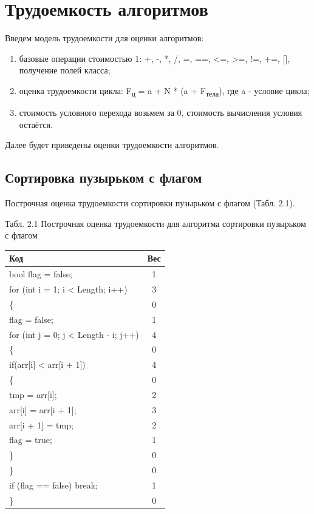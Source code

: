 \documentclass[12pt]{report}
\begin{document}
\section{Трудоемкость алгоритмов}
Введем модель трудоемкости для оценки алгоритмов:
\begin{enumerate}
  	\item  базовые операции стоимостью 1: +, -, *, /, =, ==, <=, >=, !=, +=, [], получение полей класса;
	\item оценка трудоемкости цикла: F\textsubscript{ц} = a + N * (a + F\textsubscript{тела}), где a - условие цикла;
	\item стоимость условного перехода возьмем за 0, стоимость вычисления условия остаётся.
\end{enumerate}

Далее будет приведены оценки трудоемкости алгоритмов. 

\subsection{Сортировка пузырьком с флагом}
Построчная оценка трудоемкости сортировки пузырьком с флагом (Табл. 2.1).
\begin{center}
Табл. 2.1 Построчная оценка трудоемкости для алгоритма сортировки пузырьком с флагом

	\begin{tabular}{|l c|} 
 	\hline
	Код & Вес \\ [0.5ex] 
 	\hline
	bool flag = false; & 1\\
 	\hline
	for (int i = 1; i < Length; i++) & 3\\
	\hline
	\{ & 0\\
	\hline
	\quad flag = false; & 1\\
 	\hline
	\quad for (int j = 0; j < Length - i; j++) & 4\\
	\hline
	\quad \{ & 0\\	
	\hline
	\quad \quad if(arr[i] < arr[i + 1]) & 4\\
	\hline
	\quad \quad \{ & 0\\
	\hline
	\quad \quad \quad tmp = arr[i]; & 2\\
	\hline
    \quad \quad \quad arr[i] = arr[i + 1]; & 3\\
    \hline
    \quad \quad \quad arr[i + 1] = tmp; & 2\\
    \hline
    \quad \quad \quad flag = true; & 1\\
    \hline
    \quad \quad \} & 0\\
	\hline
	\quad \} & 0\\
	\hline
	\quad if (flag == false) break;  & 1\\
	\hline
	\} & 0\\
	\hline
	\end{tabular}
\end{center}
\end{document}
